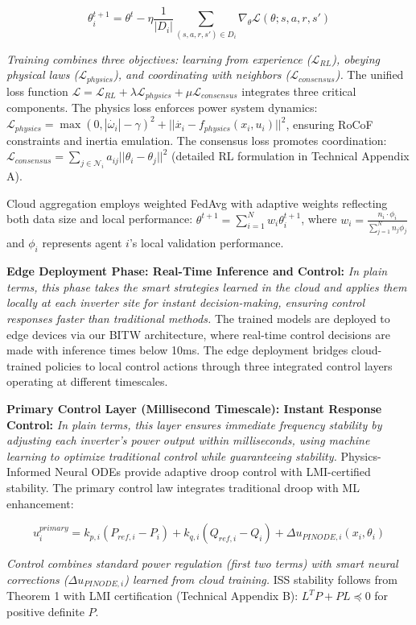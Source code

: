 \documentclass[12pt]{article}
\begin{document}
$$\theta_i^{t+1} = \theta^t - \eta \frac{1}{|D_i|} \sum_{(s,a,r,s') \in D_i} \nabla_{\theta} \mathcal{L}(\theta; s, a, r, s')$$

\textit{Training combines three objectives: learning from experience ($\mathcal{L}_{RL}$), obeying physical laws ($\mathcal{L}_{physics}$), and coordinating with neighbors ($\mathcal{L}_{consensus}$).} The unified loss function $\mathcal{L} = \mathcal{L}_{RL} + \lambda \mathcal{L}_{physics} + \mu \mathcal{L}_{consensus}$ integrates three critical components. The physics loss enforces power system dynamics: $\mathcal{L}_{physics} = \max(0, |\dot{\omega_i}| - \gamma)^2 + ||\dot{x_i} - f_{physics}(x_i, u_i)||^2$, ensuring RoCoF constraints and inertia emulation. The consensus loss promotes coordination: $\mathcal{L}_{consensus} = \sum_{j \in \mathcal{N}_i} a_{ij} ||\theta_i - \theta_j||^2$ (detailed RL formulation in Technical Appendix A).

Cloud aggregation employs weighted FedAvg with adaptive weights reflecting both data size and local performance: $\theta^{t+1} = \sum_{i=1}^N w_i \theta_i^{t+1}$, where $w_i = \frac{n_i \cdot \phi_i}{\sum_{j=1}^N n_j \phi_j}$ and $\phi_i$ represents agent $i$'s local validation performance.

\textbf{Edge Deployment Phase: Real-Time Inference and Control:} \textit{In plain terms, this phase takes the smart strategies learned in the cloud and applies them locally at each inverter site for instant decision-making, ensuring control responses faster than traditional methods.} The trained models are deployed to edge devices via our BITW architecture, where real-time control decisions are made with inference times below 10ms. The edge deployment bridges cloud-trained policies to local control actions through three integrated control layers operating at different timescales.

\textbf{Primary Control Layer (Millisecond Timescale): Instant Response Control:} \textit{In plain terms, this layer ensures immediate frequency stability by adjusting each inverter's power output within milliseconds, using machine learning to optimize traditional control while guaranteeing stability.} Physics-Informed Neural ODEs provide adaptive droop control with LMI-certified stability. The primary control law integrates traditional droop with ML enhancement:

$$u_i^{primary} = k_{p,i}(P_{ref,i} - P_i) + k_{q,i}(Q_{ref,i} - Q_i) + \Delta u_{PINODE,i}(x_i, \theta_i)$$

\textit{Control combines standard power regulation (first two terms) with smart neural corrections ($\Delta u_{PINODE,i}$) learned from cloud training.} ISS stability follows from Theorem 1 with LMI certification (Technical Appendix B): $L^T P + PL \preceq 0$ for positive definite $P$.
\end{document}
